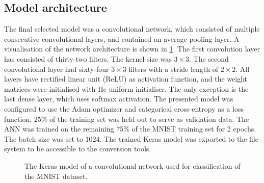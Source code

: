 \subsection{Model architecture}
The final selected model was a convolutional network, which consisted of multiple consecutive convolutional layers, and contained an average pooling layer. A visualisation of the network architecture is shown in \cref{fig:keras_model}. The first convolution layer has consisted of thirty-two filters. The kernel size was $3 \times 3$. The second convolutional layer had sixty-four $3 \times 3$ filters with a stride length of $2 \times 2$. All layers have rectified linear unit (ReLU) as activation function, and the weight matrices were initialised with He uniform initialiser. The only exception is the last dense layer, which uses softmax activation. The presented model was configured to use the Adam \cite{kingmaAdamMethod17} optimizer and categorical cross-entropy as a loss function. 25\% of the training set was held out to serve as validation data. The ANN was trained on the remaining 75\% of the MNIST training set for 2 epochs. The batch size was set to 1024. The trained Keras model was exported to the file system to be accessible to the conversion tools. \par
\begin{figure}[ht]
    \centering
    
    \caption{The Keras model of a convolutional network used for classification of the MNIST dataset.}
    \label{fig:keras_model}
\end{figure}

